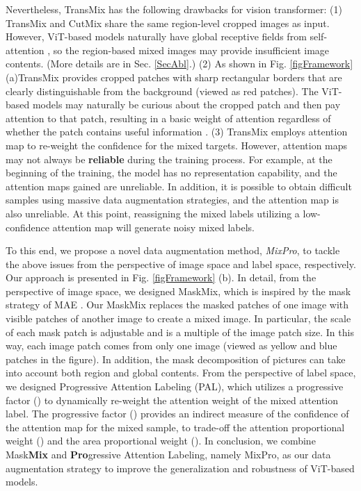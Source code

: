 \documentclass{article} \usepackage{iclr2023_conference,times}
\begin{document}
Nevertheless, TransMix \citep{chen2021transmix} has the following drawbacks for vision transformer: (1) TransMix and CutMix share the same region-level cropped images as input. However, ViT-based models naturally have global receptive fields from self-attention \citep{2020ViTs}, so the region-based mixed images may provide insufficient image contents. (More details are in Sec. \ref{SecAbl}.) (2) As shown in Fig. \ref{figFramework} (a)TransMix provides cropped patches with sharp rectangular borders that are clearly distinguishable from the background (viewed as red patches). The ViT-based models may naturally be curious about the cropped patch and then pay attention to that patch, resulting in a basic weight of attention regardless of whether the patch contains useful information \citep{chen2021transmix}. (3) TransMix employs attention map to re-weight the confidence for the mixed targets. However, attention maps may not always be \textbf{reliable} during the training process. For example, at the beginning of the training, the model has no representation capability, and the attention maps gained are unreliable. In addition, it is possible to obtain difficult samples using massive data augmentation strategies, and the attention map is also unreliable. At this point, reassigning the mixed labels utilizing a low-confidence attention map will generate noisy mixed labels.

To this end, we propose a novel data augmentation method, \emph{MixPro}, to tackle the above issues from the perspective of image space and label space, respectively. Our approach is presented in Fig. \ref{figFramework} (b). In detail, from the perspective of image space, we designed MaskMix, which is inspired by the mask strategy of MAE \citep{he2022masked}. Our MaskMix replaces the masked patches of one image with visible patches of another image to create a mixed image. In particular, the scale of each mask patch is adjustable and is a multiple of the image patch size. In this way, each image patch comes from only one image (viewed as yellow and blue patches in the figure). In addition, the mask decomposition of pictures can take into account both region and global contents. From the perspective of label space, we designed Progressive Attention Labeling (PAL), which utilizes a progressive factor () to dynamically re-weight the attention weight of the mixed attention label. The progressive factor () provides an indirect measure of the confidence of the attention map for the mixed sample, to trade-off the attention proportional weight () and the area proportional weight (). In conclusion, we combine Mask\textbf{Mix} and \textbf{Pro}gressive Attention Labeling, namely MixPro, as our data augmentation strategy to improve the generalization and robustness of ViT-based models.
\end{document}
